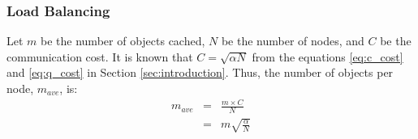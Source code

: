 \documentclass[9.5pt,journal,final,finalsubmission,twocolumn]{IEEEtran}
\begin{document}

\subsubsection{Load Balancing}
Let $m$ be the number of objects cached, $N$ be the number of nodes, and 
$C$ be the communication cost. It is known that $C=\sqrt{\alpha N}$ from 
the equations \eqref{eq:c_cost} and \eqref{eq:q_cost} in Section 
\ref{sec:introduction}.
Thus, the number of objects per node, $m_{ave}$, is:
\begin{eqnarray}
m_{ave} &=& \frac{m\times C}{N} \\
      &=& m \sqrt{\frac{\alpha}{N}} 
\end{eqnarray}
\end{document}

